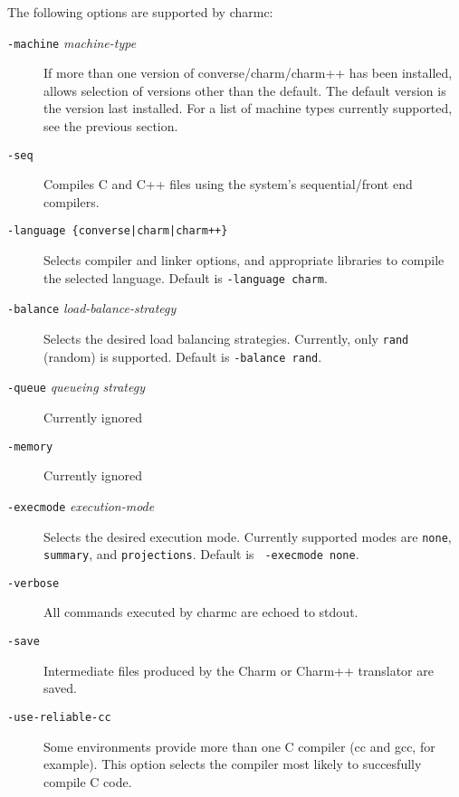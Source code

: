 The following options are supported by charmc:
\begin{description}

\item[{\tt -machine} {\em machine-type}]

If more than one version of converse/charm/charm++ has been installed,
allows selection of versions other than the default.  The default
version is the version last installed. For a list of machine types
currently supported, see the previous section.

\item[{\tt -seq}]

Compiles C and C++ files using the system's sequential/front end
compilers.

\item[{\tt -language \{converse|charm|charm++\}}]

Selects compiler and linker options, and appropriate libraries
to compile the selected language.  Default is {\tt -language charm}.

\item[{\tt -balance} {\em load-balance-strategy}]

Selects the desired load balancing strategies.  Currently, only {\tt rand}
(random) is supported. Default is {\tt -balance rand}.
	
\item[{\tt -queue} {\em queueing strategy}]

Currently ignored

\item[{\tt -memory}]

Currently ignored

\item[{\tt -execmode} {\em execution-mode}]

Selects the desired execution mode.  Currently supported modes are
{\tt none}, {\tt summary}, and {\tt projections}. Default is {\tt
-execmode none}.
	
\item[{\tt -verbose}]

All commands executed by charmc are echoed to stdout.

\item[{\tt -save}]

Intermediate files produced by the Charm or Charm++ translator are saved.

\item[{\tt -use-reliable-cc}]

Some environments provide more than one C compiler (cc and gcc, for
example).  This option selects the compiler most likely to succesfully
compile C code.


\end{description}
